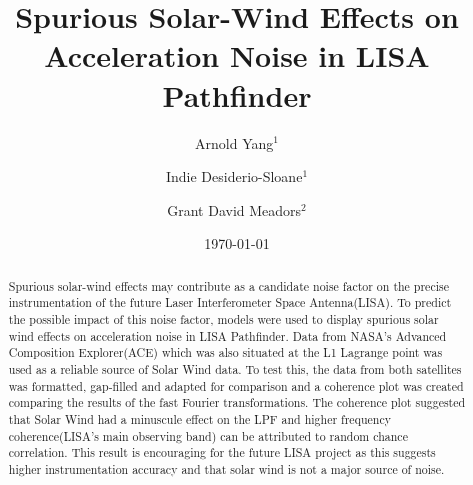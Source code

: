 \documentclass[%
 reprint,
 amsmath,amssymb,
 aps,
]{revtex4-2}
\begin{document}

\title{Spurious Solar-Wind Effects on Acceleration Noise in LISA Pathfinder}%
\author{Arnold Yang\(^1\)}%
\author{Indie Desiderio-Sloane\(^1\)}
 \author{Grant David Meadors\(^2\)}

%

\date{\today}%

\begin{abstract}
Spurious solar-wind effects may contribute as a candidate noise factor on the precise instrumentation of the future Laser Interferometer Space Antenna(LISA). To predict the possible impact of this noise factor, models were used to display spurious solar wind effects on acceleration noise in LISA Pathfinder. Data from NASA's Advanced Composition Explorer(ACE) which was also situated at the L1 Lagrange point was used as a reliable source of Solar Wind data. To test this, the data from both satellites was formatted, gap-filled and adapted for comparison and a coherence plot was created comparing the results of the fast Fourier transformations. The coherence plot suggested that Solar Wind had a minuscule effect on the LPF and higher frequency coherence(LISA’s main observing band) can be attributed to random chance correlation. This result is encouraging for the future LISA project as this suggests higher instrumentation accuracy and that solar wind is not a major source of noise. 
\end{abstract}

\maketitle

\end{document}
